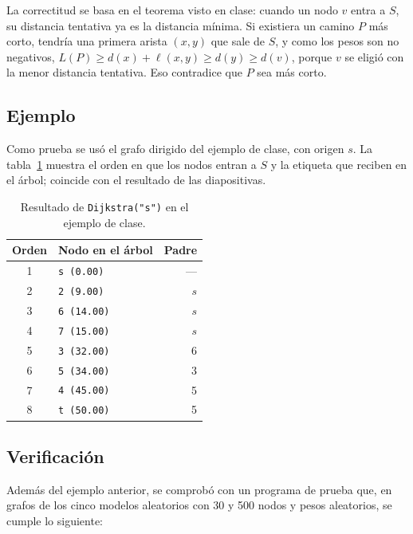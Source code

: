 \documentclass[11pt,letterpaper]{article}
\begin{document}
La correctitud se basa en el teorema visto en clase: cuando un nodo $v$ entra a
$S$, su distancia tentativa ya es la distancia mínima. Si existiera un camino $P$
más corto, tendría una primera arista $(x, y)$ que sale de $S$, y como los pesos
son no negativos, $L(P) \geq d(x) + \ell(x, y) \geq d(y) \geq d(v)$, porque $v$ se
eligió con la menor distancia tentativa. Eso contradice que $P$ sea más corto.

\subsection{Ejemplo}

Como prueba se usó el grafo dirigido del ejemplo de clase, con origen $s$. La
tabla~\ref{tab:ejemplo} muestra el orden en que los nodos entran a $S$ y la
etiqueta que reciben en el árbol; coincide con el resultado de las diapositivas.

\begin{table}[H]
\centering
\begin{tabular}{clr}
\toprule
Orden & Nodo en el árbol & Padre \\
\midrule
1 & \texttt{s (0.00)} & --- \\
2 & \texttt{2 (9.00)} & $s$ \\
3 & \texttt{6 (14.00)} & $s$ \\
4 & \texttt{7 (15.00)} & $s$ \\
5 & \texttt{3 (32.00)} & 6 \\
6 & \texttt{5 (34.00)} & 3 \\
7 & \texttt{4 (45.00)} & 5 \\
8 & \texttt{t (50.00)} & 5 \\
\bottomrule
\end{tabular}
\caption{Resultado de \texttt{Dijkstra("s")} en el ejemplo de clase.}
\label{tab:ejemplo}
\end{table}

\subsection{Verificación}

Además del ejemplo anterior, se comprobó con un programa de prueba que, en grafos
de los cinco modelos aleatorios con 30 y 500 nodos y pesos aleatorios, se cumple
lo siguiente:
\end{document}

